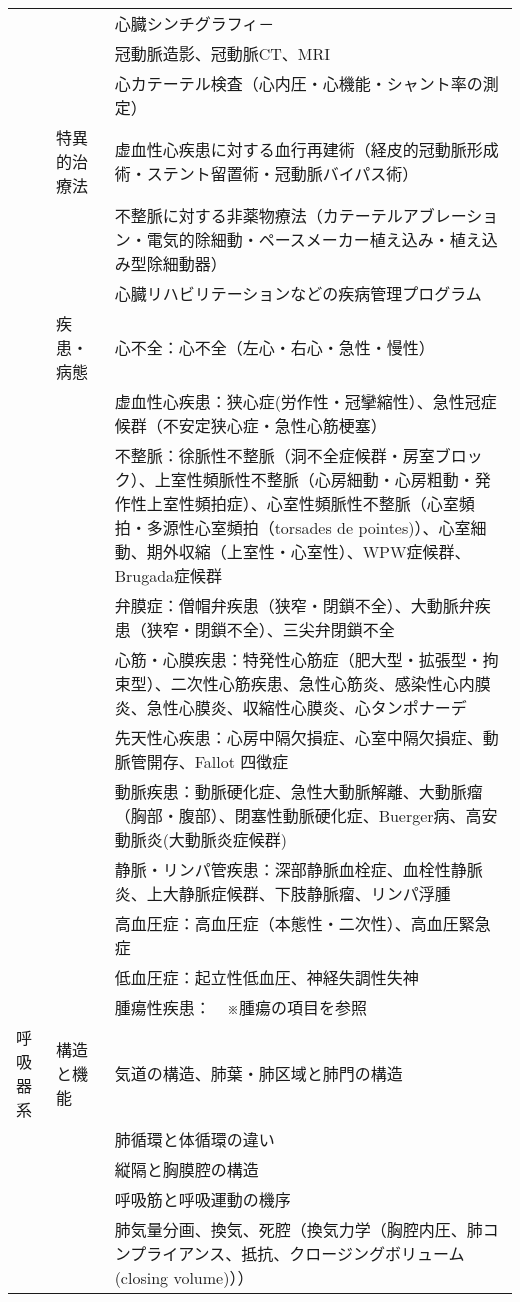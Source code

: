 \documentclass[
]{ltjsarticle}
\begin{document}
\begin{xltabular}{\linewidth}{XXX}
 &  & 心臓シンチグラフィ－ \\
 &  & 冠動脈造影、冠動脈CT、MRI \\
 &  & 心カテーテル検査（心内圧・心機能・シャント率の測定） \\
 & 特異的治療法 & 虚血性心疾患に対する血行再建術（経皮的冠動脈形成術・ステント留置術・冠動脈バイパス術） \\
 &  & 不整脈に対する非薬物療法（カテーテルアブレーション・電気的除細動・ペースメーカー植え込み・植え込み型除細動器） \\
 &  & 心臓リハビリテーションなどの疾病管理プログラム \\
 & 疾患・病態 & 心不全：心不全（左心・右心・急性・慢性） \\
 &  & 虚血性心疾患：狭心症(労作性・冠攣縮性）、急性冠症候群（不安定狭心症・急性心筋梗塞） \\
 &  & 不整脈：徐脈性不整脈（洞不全症候群・房室ブロック）、上室性頻脈性不整脈（心房細動・心房粗動・発作性上室性頻拍症）、心室性頻脈性不整脈（心室頻拍・多源性心室頻拍（torsades de pointes)）、心室細動、期外収縮（上室性・心室性）、WPW症候群、Brugada症候群 \\
 &  & 弁膜症：僧帽弁疾患（狭窄・閉鎖不全）、大動脈弁疾患（狭窄・閉鎖不全）、三尖弁閉鎖不全 \\
 &  & 心筋・心膜疾患：特発性心筋症（肥大型・拡張型・拘束型）、二次性心筋疾患、急性心筋炎、感染性心内膜炎、急性心膜炎、収縮性心膜炎、心タンポナーデ \\
 &  & 先天性心疾患：心房中隔欠損症、心室中隔欠損症、動脈管開存、Fallot 四徴症 \\
 &  & 動脈疾患：動脈硬化症、急性大動脈解離、大動脈瘤（胸部・腹部）、閉塞性動脈硬化症、Buerger病、高安動脈炎(大動脈炎症候群) \\
 &  & 静脈・リンパ管疾患：深部静脈血栓症、血栓性静脈炎、上大静脈症候群、下肢静脈瘤、リンパ浮腫 \\
 &  & 高血圧症：高血圧症（本態性・二次性）、高血圧緊急症 \\
 &  & 低血圧症：起立性低血圧、神経失調性失神 \\
 &  & 腫瘍性疾患：　※腫瘍の項目を参照 \\
呼吸器系 & 構造と機能 & 気道の構造、肺葉・肺区域と肺門の構造 \\
 &  & 肺循環と体循環の違い \\
 &  & 縦隔と胸膜腔の構造 \\
 &  & 呼吸筋と呼吸運動の機序 \\
 &  & 肺気量分画、換気、死腔（換気力学（胸腔内圧、肺コンプライアンス、抵抗、クロージングボリューム(closing volume)）） \\

\end{xltabular}
\end{document}
